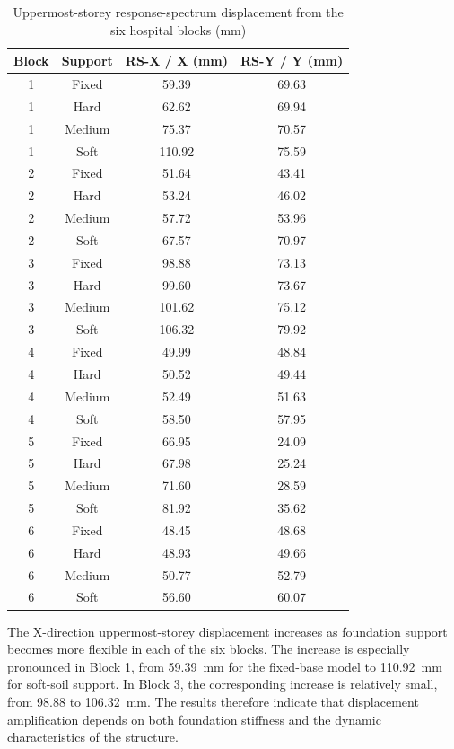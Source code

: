 \begin{table}[!htbp]
\fontsize{11}{13}\selectfont\setlength{\tabcolsep}{4pt}
\centering
\fontsize{11}{13}\selectfont\setlength{\tabcolsep}{4pt}\renewcommand{\arraystretch}{0.95}
\caption{Uppermost-storey response-spectrum displacement from the six hospital blocks (mm)}\label{tab:seq54_disp}
\begin{tabular*}{\linewidth}{@{\extracolsep{\fill}}cccc@{}}
\toprule
Block & Support & RS-X / X (mm) & RS-Y / Y (mm)\\
\midrule
1 & Fixed & 59.39 & 69.63 \\
1 & Hard & 62.62 & 69.94 \\
1 & Medium & 75.37 & 70.57 \\
1 & Soft & 110.92 & 75.59 \\
2 & Fixed & 51.64 & 43.41 \\
2 & Hard & 53.24 & 46.02 \\
2 & Medium & 57.72 & 53.96 \\
2 & Soft & 67.57 & 70.97 \\
3 & Fixed & 98.88 & 73.13 \\
3 & Hard & 99.60 & 73.67 \\
3 & Medium & 101.62 & 75.12 \\
3 & Soft & 106.32 & 79.92 \\
4 & Fixed & 49.99 & 48.84 \\
4 & Hard & 50.52 & 49.44 \\
4 & Medium & 52.49 & 51.63 \\
4 & Soft & 58.50 & 57.95 \\
5 & Fixed & 66.95 & 24.09 \\
5 & Hard & 67.98 & 25.24 \\
5 & Medium & 71.60 & 28.59 \\
5 & Soft & 81.92 & 35.62 \\
6 & Fixed & 48.45 & 48.68 \\
6 & Hard & 48.93 & 49.66 \\
6 & Medium & 50.77 & 52.79 \\
6 & Soft & 56.60 & 60.07 \\
\bottomrule
\end{tabular*}
\end{table}

The X-direction uppermost-storey displacement increases as foundation support becomes more flexible in each of the six blocks. The increase is especially pronounced in Block 1, from 59.39~mm for the fixed-base model to 110.92~mm for soft-soil support. In Block 3, the corresponding increase is relatively small, from 98.88 to 106.32~mm. The results therefore indicate that displacement amplification depends on both foundation stiffness and the dynamic characteristics of the structure.


